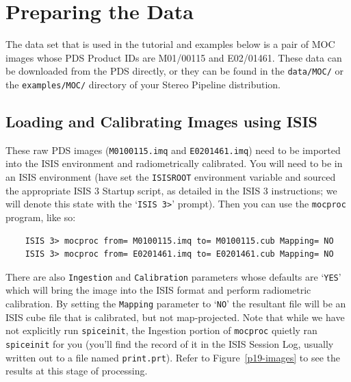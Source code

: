 \section{Preparing the Data}

The data set that is used in the tutorial and examples below is a
pair of \ac{MOC} \citep{1992JGR....97.7699M,2001JGR...10623429M}
images whose \ac{PDS} Product IDs are M01/00115 and E02/01461.
These data can be downloaded from the PDS directly, or they can be
found in the \texttt{data/MOC/} or the \texttt{examples/MOC/}
directory of your Stereo Pipeline distribution.

\subsection{Loading and Calibrating Images using ISIS}

These raw \ac{PDS} images (\texttt{M0100115.imq} and \texttt{E0201461.imq})
need to be imported into the \ac{ISIS} environment and radiometrically
calibrated.  You will need to be in an \ac{ISIS} environment (have
set the \texttt{ISISROOT} environment variable and sourced the
appropriate \ac{ISIS} 3 Startup script, as detailed in the \ac{ISIS}
3 instructions; we will denote this state with the `\texttt{ISIS
3>}' prompt).  Then you can use the \texttt{mocproc} program, like
so:

\begin{verbatim}
    ISIS 3> mocproc from= M0100115.imq to= M0100115.cub Mapping= NO
    ISIS 3> mocproc from= E0201461.imq to= E0201461.cub Mapping= NO
\end{verbatim}

There are also \texttt{Ingestion} and \texttt{Calibration} parameters
whose defaults are `\texttt{YES}' which will bring the image into the
\ac{ISIS} format and perform radiometric calibration.  By setting the
\texttt{Mapping} parameter to `\texttt{NO}' the resultant file will be
an \ac{ISIS} cube file that is calibrated, but not map-projected.
Note that while we have not explicitly run \texttt{spiceinit}, the
Ingestion portion of \texttt{mocproc} quietly ran \texttt{spiceinit}
for you (you'll find the record of it in the \ac{ISIS} Session Log,
usually written out to a file named \texttt{print.prt}).  Refer to
Figure~\ref{p19-images} to see the results at this stage of
processing.

